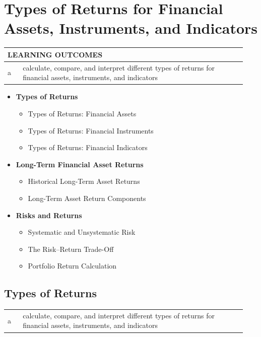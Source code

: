 \chapter{Types of Returns for Financial Assets, Instruments, and Indicators}
\label{chap:types-financial-returns}

\begin{center}
\begin{tabular}{p{0.06\linewidth} | p{0.88\linewidth}}
	\toprule
	\multicolumn{2}{l}{\textbf{LEARNING OUTCOMES}} \\
	\midrule
	a & calculate, compare, and interpret different types of returns for financial assets, instruments, and indicators \\
	\bottomrule
\end{tabular}
\end{center}

\vspace{1.5em}

\begin{itemize}
	\item[] \textbf{Types of Returns}
	      \begin{itemize}
			\item[] Types of Returns: Financial Assets
			\item[] Types of Returns: Financial Instruments
			\item[] Types of Returns: Financial Indicators
	      \end{itemize}
	\item[] \textbf{Long-Term Financial Asset Returns}
	      \begin{itemize}
			\item[] Historical Long-Term Asset Returns
			\item[] Long-Term Asset Return Components
	      \end{itemize}
	\item[] \textbf{Risks and Returns}
	      \begin{itemize}
			\item[] Systematic and Unsystematic Risk
			\item[] The Risk--Return Trade-Off
			\item[] Portfolio Return Calculation
	      \end{itemize}
\end{itemize}

\section{Types of Returns}
\label{sec:Types of Returns}
\begin{center}
\begin{tabular}{p{0.06\linewidth} | p{0.88\linewidth}}
	a & calculate, compare, and interpret different types of returns for financial assets, instruments, and indicators \\
\end{tabular}
\end{center}

